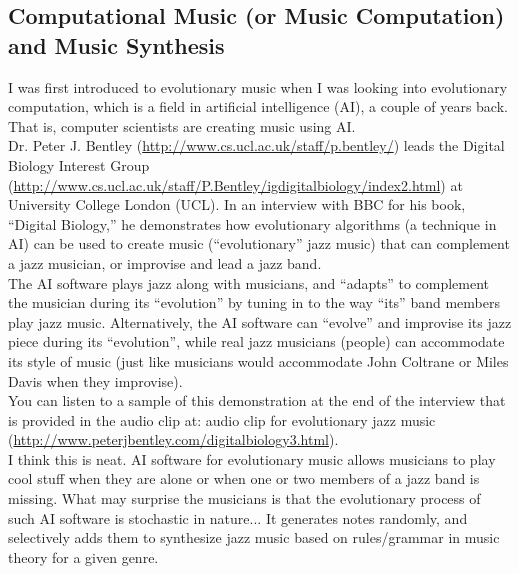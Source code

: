 \subsection{\hspace{0.1in} Computational Music (or Music Computation) and Music Synthesis}
\label{computationalmusic}

I was first introduced to evolutionary music when I was looking into evolutionary computation, which is a field in artificial intelligence (AI), a couple of years back. That is, computer scientists are creating music using AI. \\
 
Dr. Peter J. Bentley (\url{http://www.cs.ucl.ac.uk/staff/p.bentley/}) leads the Digital Biology Interest Group (\url{http://www.cs.ucl.ac.uk/staff/P.Bentley/igdigitalbiology/index2.html}) at University College London (UCL). In an interview with BBC for his book, ``Digital Biology,'' he demonstrates how evolutionary algorithms (a technique in AI) can be used to create music (``evolutionary'' jazz music) that can complement a jazz musician, or improvise and lead a jazz band. \\
 
The AI software plays jazz along with musicians, and ``adapts'' to complement the musician during its ``evolution'' by tuning in to the way ``its'' band members play jazz music. Alternatively, the AI software can ``evolve'' and improvise its jazz piece during its ``evolution'', while real jazz musicians (people) can accommodate its style of music (just like musicians would accommodate John Coltrane or Miles Davis when they improvise). \\
 
You can listen to a sample of this demonstration at the end of the interview that is provided in the audio clip at: audio clip for evolutionary jazz music (\url{http://www.peterjbentley.com/digitalbiology3.html}). \\
 
I think this is neat. AI software for evolutionary music allows musicians to play cool stuff when they are alone or when one or two members of a jazz band is missing. What may surprise the musicians is that the evolutionary process of such AI software is stochastic in nature... It generates notes randomly, and selectively adds them to synthesize jazz music based on rules/grammar in music theory for a given genre. \\
 
